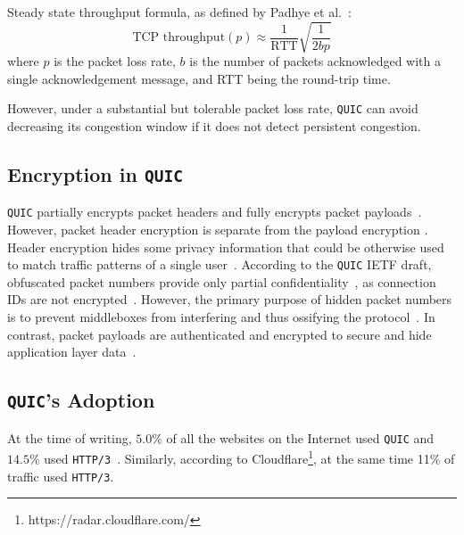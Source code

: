 \documentclass[12pt,a4paper]{report}
\newcommand\note[2]{{\color{#1}\bf #2}}
\newcommand\simon[1]{\ifcomments{\note{cyan}{SM: #1}}\fi}
\begin{document}
  Steady state throughput formula, as defined by Padhye et al.~\cite{TCP_throughput_formula}: 
    \begin{equation}
    \textrm{TCP throughput} (p) \approx \frac{1}{\textrm{RTT}}\sqrt{\frac{1}{2bp}} 
    \label{eq:gass_stuff}
    \end{equation}
     where $p$ is the packet loss rate, $b$ is the number of packets acknowledged with a single acknowledgement message, and RTT being the round-trip time.
  
  
  However, under a substantial but tolerable packet loss rate, \texttt{QUIC} can avoid decreasing its congestion window if it does not detect persistent congestion.
  
  



\subsection{Encryption in \texttt{QUIC}} \label{subsection_QUIC_header_format}


\texttt{QUIC} partially encrypts packet headers and fully encrypts packet payloads~\cite{the-road-to-quic}.
However, packet header encryption is separate from the payload encryption
\simon{TODO: FIND SOURCE}.
Header encryption hides some privacy information that could be otherwise used to match traffic patterns of a single user~\cite{2017-12-18-transport-header-encryption, the-road-to-quic}.
According to the \texttt{QUIC} IETF draft, obfuscated packet numbers provide only partial confidentiality~\cite{ietf-quic-transport-draft-32}, as connection IDs are not encrypted~\cite[Section~5.4.1]{ietf-quic-tls-32}.
However, the primary purpose of hidden packet numbers is to prevent middleboxes from interfering and thus ossifying the protocol~\cite{the-road-to-quic}.
In contrast, packet payloads are authenticated and encrypted to secure and hide application layer data~\cite{ietf-quic-tls-32}.

  
  
\subsection{\texttt{QUIC}'s Adoption}

At the time of writing, $5.0\%$ of all the websites on the Internet used \texttt{QUIC} and $14.5\%$ used \texttt{HTTP/3}~\cite{bib_Adoption_comparison_Between_http2_http3_quic}.
Similarly, according to Cloudflare\footnote{https://radar.cloudflare.com/}, at the same time 11\% of traffic used \texttt{HTTP/3}.
\end{document}
